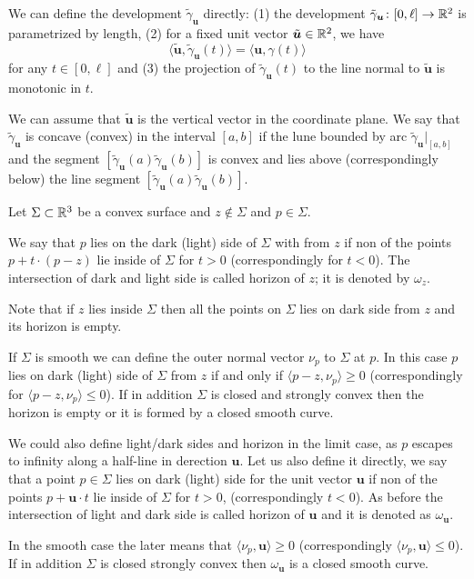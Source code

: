 \documentclass[a4paper,10pt]{amsart}
\begin{document}
We can define the development $\tilde\gamma_{\bm{u}}$ directly:
(1) the development $\tilde\gamma_{\bm{u}}\colon[0,\ell]\to \mathbb{R}^2$
is parametrized by length,
(2) for a fixed unit vector $\tilde{\bm{u}}\in\mathbb{R}^2$,
we have
\[\langle \tilde{\bm{u}},\tilde\gamma_{\bm{u}}(t)\rangle
=
\langle  \bm{u},\gamma(t)\rangle\]
for any $t\in [0,\ell]$
and 
(3) the projection of $\tilde\gamma_{\bm{u}}(t)$ to the line normal to $\tilde{\bm{u}}$
is monotonic in $t$.

We can assume that $\tilde{\bm{u}}$ is the vertical vector in the coordinate plane.
We say that $\tilde\gamma_{\bm{u}}$ is concave (convex) in the interval $[a,b]$ 
if the lune bounded by arc $\tilde\gamma_{\bm{u}}|_{[a,b]}$
and the segment $[\tilde\gamma_{\bm{u}}(a)\tilde\gamma_{\bm{u}}(b)]$
is convex and lies above (correspondingly below) the line segment $[\tilde\gamma_{\bm{u}}(a)\tilde\gamma_{\bm{u}}(b)]$.
 
Let $\Sigma\subset\mathbb{R}^3$ be a convex surface 
and $z\notin\Sigma$ and $p\in\Sigma$.

We say that $p$ lies on the dark (light) side of $\Sigma$ with from $z$ 
if non of the points $p+t\cdot(p-z)$ lie inside of $\Sigma$ for $t>0$ (correspondingly for $t<0$).
The intersection of dark and light side is called horizon of $z$;
it is denoted by $\omega_z$.

Note that if $z$ lies inside $\Sigma$ then all the points on $\Sigma$ lies on dark side from $z$ and its horizon is empty.

If $\Sigma$ is smooth we can define the outer normal vector $\nu_p$ to $\Sigma$ at $p$.
In this case $p$ lies on dark (light) side of $\Sigma$ from $z$
if and only if $\langle p-z,\nu_p\rangle\ge 0$
(correspondingly for $\langle p-z,\nu_p\rangle\le 0$).
If in addition $\Sigma$ is closed and strongly convex then the horizon is empty or it is formed by a closed smooth curve.

We could also define light/dark sides and horizon in the limit case,
as $p$ escapes to infinity along a half-line in derection $\bm{u}$.
Let us also define it directly,
we say that a point $p\in\Sigma$ lies on dark (light) side for the unit vector $\bm{u}$ if non of the points $p+\bm{u}\cdot t$ lie inside of $\Sigma$ for $t>0$, (correspondingly $t<0$).
As before the intersection of light and dark side is called horizon of $\bm{u}$ and it is denoted as $\omega_{\bm{u}}$.

In the smooth case the later means that $\langle \nu_p,\bm{u}\rangle\ge 0$ (correspondingly $\langle \nu_p,\bm{u}\rangle\le 0$).
If in addition $\Sigma$ is closed strongly convex then $\omega_{\bm{u}}$ is a closed smooth curve.
\end{document}
